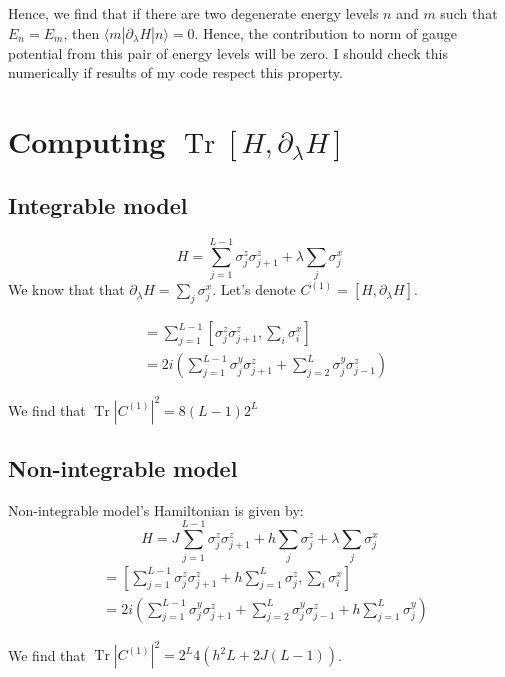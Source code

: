 \documentclass[11pt,a4paper]{article}
\DeclareMathOperator{\Tr}{Tr}
\begin{document}
Hence, we find that if there are two degenerate energy levels $n$ and $m$ such that $E_n=E_m$, then $\langle  m  | \partial_{\lambda} H | n \rangle=0$. Hence, the contribution to norm of gauge potential from this pair of energy levels will be zero. I should check this numerically if results of my code respect this property.


\section{Computing $\Tr [H, \partial_{\lambda}H] $}
\subsection{Integrable model}
\begin{equation}
H=  \sum_{j=1}^{L-1} \sigma_j^z \sigma_{j+1}^z + \lambda \sum_{j} \sigma_j^x
\end{equation}
We know that that $\partial_{\lambda}H =  \sum_{j} \sigma_j^x $. Let's denote  $C^{(1)}=[H,\partial_{\lambda}H]$. 


\begin{align*}
[H,\partial_{\lambda}H] & = \sum_{j=1}^{L-1} [\sigma_j^z \sigma_{j+1}^z , \sum_{i} \sigma_i^x]  \\
&= 2i \left(\sum_{j=1}^{L-1} \sigma_j^y \sigma_{j+1}^z + \sum_{j=2}^{L} \sigma_j^y \sigma_{j-1}^z\right)
\end{align*}

We find that $\Tr |C^{(1)}|^2 = 8 (L-1)2^L$ 

\subsection{Non-integrable model}
Non-integrable model's Hamiltonian is given by: 
\begin{equation}
H= J \sum_{j=1}^{L-1} \sigma_j^z \sigma_{j+1}^z + h\sum_{j} \sigma_j^z +\lambda \sum_{j} \sigma_j^x 
\end{equation}
\begin{align*}
[H,\partial_{\lambda}H] & =  [\sum_{j=1}^{L-1} \sigma_j^z \sigma_{j+1}^z + h\sum_{j=1}^{L} \sigma_j^z, \sum_{i} \sigma_i^x]  \\
&= 2i \left(\sum_{j=1}^{L-1} \sigma_j^y \sigma_{j+1}^z + \sum_{j=2}^{L} \sigma_j^y \sigma_{j-1}^z + h \sum_{j=1}^{L}\sigma_j^y \right) 
\end{align*}


We find that $\Tr |C^{(1)}|^2 = 2^L 4(h^2 L + 2J(L-1))$. 
 
\end{document}
